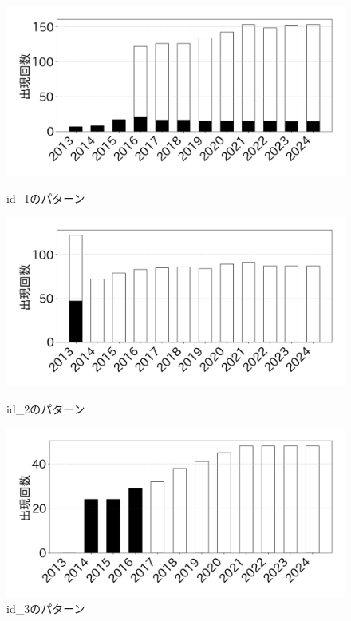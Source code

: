 \documentclass[submit,techrep,noauthor]{ipsj}
\begin{document}
\begin{figure}[h]
    \centering
        \includegraphics[width=0.9\linewidth]{@BSthesis2024_Noguchi/Noguchi_fig/id_1.png}
        \vspace{-4mm}
        \caption{id\_1のパターン}
        \label{table:id_1}
        
        \includegraphics[width=0.9\linewidth]{@BSthesis2024_Noguchi/Noguchi_fig/id_2.png}
        \vspace{-4mm}
        \caption{id\_2のパターン}
        \label{table:id_2}
        
        \includegraphics[width=0.9\linewidth]{@BSthesis2024_Noguchi/Noguchi_fig/id_3.png}
        \vspace{-4mm}
        \caption{id\_3のパターン}
        \label{table:id_3}
        

\end{figure}
\end{document}

